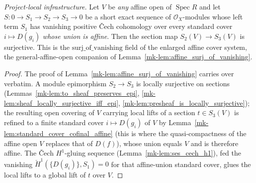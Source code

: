 \begin{lemma}\label{mk-lem:affine_surj_of_vanishing_affine}
  \leanok

  \textit{Project-local infrastructure.}
  Let \(V\) be \emph{any} affine open of \(\operatorname{Spec} R\) and let
  \(S : 0 \to S_1 \to S_2 \to S_3 \to 0\) be a short exact sequence of \(\mathcal{O}_X\)-modules whose
  left term \(S_1\) has vanishing positive {\v C}ech cohomology over every standard cover
  \(i \mapsto D(g_i)\) \emph{whose union is affine}. Then the section map \(S_2(V) \to S_3(V)\) is
  surjective. This is the \(\mathrm{surj\_of\_vanishing}\) field of the enlarged affine cover system, the
  general-affine-open companion of Lemma~\ref{mk-lem:affine_surj_of_vanishing}.
\end{lemma}
\begin{proof}
  \leanok
    The proof of Lemma~\ref{mk-lem:affine_surj_of_vanishing} carries over verbatim. A module epimorphism
  \(S_2 \to S_3\) is locally surjective on sections (Lemmas~\ref{mk-lem:to_sheaf_preserves_epi},
  \ref{mk-lem:sheaf_locally_surjective_iff_epi}, \ref{mk-lem:presheaf_is_locally_surjective}); the resulting
  open covering of \(V\) carrying local lifts of a section \(t \in S_3(V)\) is refined to a finite standard
  cover \(i \mapsto D(g_i)\) of \(V\) by Lemma~\ref{mk-lem:standard_cover_cofinal_affine} (this is where the
  quasi-compactness of the affine open \(V\) replaces that of \(D(f)\)), whose union equals \(V\) and is
  therefore affine. The {\v C}ech \(H^1\)-gluing sequence (Lemma~\ref{mk-lem:ses_cech_h1}), fed the vanishing
  \(\check{H}^1(\{D(g_i)\}, S_1) = 0\) for that affine-union standard cover, glues the local lifts to a
  global lift of \(t\) over \(V\).
\end{proof}

